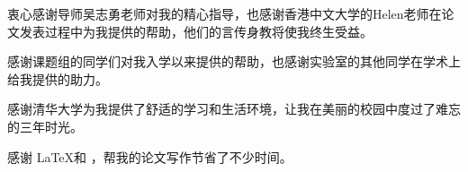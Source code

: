 \begin{acknowledgement}
  衷心感谢导师吴志勇老师对我的精心指导，也感谢香港中文大学的Helen老师在论文发表过程中为我提供的帮助，他们的言传身教将使我终生受益。

  感谢课题组的同学们对我入学以来提供的帮助，也感谢实验室的其他同学在学术上给我提供的助力。

  感谢清华大学为我提供了舒适的学习和生活环境，让我在美丽的校园中度过了难忘的三年时光。

  感谢 \LaTeX 和 \thuthesis\cite{thuthesis}，帮我的论文写作节省了不少时间。
\end{acknowledgement}
